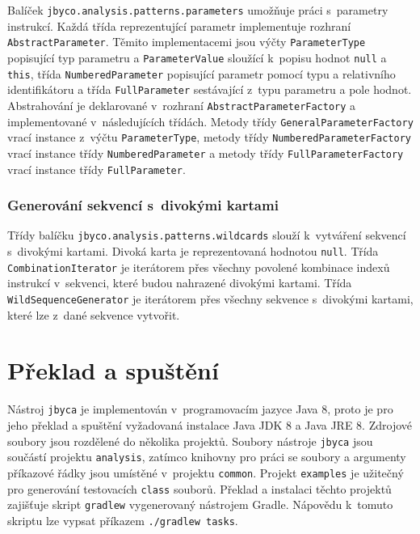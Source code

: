 Balíček \texttt{jbyco.analysis.patterns.parameters} umožňuje práci s~parametry instrukcí. Každá třída reprezentující parametr implementuje rozhraní \texttt{AbstractParameter}. Těmito implementacemi jsou výčty \texttt{ParameterType} popisující typ parametru a \texttt{ParameterValue} sloužící k~popisu hodnot \texttt{null} a \texttt{this}, třída \texttt{NumberedParameter} popisující parametr pomocí typu a relativního identifikátoru a třída \texttt{FullParameter} sestávající z~typu parametru a pole hodnot. Abstrahování je deklarované v~rozhraní \texttt{AbstractParameterFactory} a implementované v~následujících třídách. Metody třídy \texttt{GeneralParameterFactory} vrací instance z~výčtu \texttt{ParameterType}, metody třídy \texttt{NumberedParameterFactory} vrací instance třídy \texttt{NumberedParameter} a metody třídy \texttt{FullParameterFactory} vrací instance třídy \texttt{FullParameter}.

\subsubsection{Generování sekvencí s~divokými kartami}

Třídy balíčku \texttt{jbyco.analysis.patterns.wildcards} slouží k~vytváření sekvencí s~divokými kartami. Divoká karta je reprezentovaná hodnotou \texttt{null}. Třída \texttt{CombinationIterator} je iterátorem přes všechny povolené kombinace indexů instrukcí v~sekvenci, které budou nahrazené divokými kartami. Třída \texttt{WildSequenceGenerator} je iterátorem přes všechny sekvence s~divokými kartami, které lze z~dané sekvence vytvořit.

\section{Překlad a spuštění}\label{Jbyca:Run}

Nástroj \texttt{jbyca} je implementován v~programovacím jazyce Java 8, proto je pro jeho překlad a spuštění vyžadovaná instalace Java JDK 8 a Java JRE 8.
Zdrojové soubory jsou rozdělené do několika projektů. Soubory nástroje \texttt{jbyca} jsou součástí projektu \texttt{analysis}, zatímco knihovny pro práci se soubory a argumenty příkazové řádky jsou umístěné v~projektu \texttt{common}. Projekt \texttt{examples} je užitečný pro generování testovacích \texttt{class} souborů. Překlad a instalaci těchto projektů zajišťuje skript \texttt{gradlew} vygenerovaný nástrojem Gradle. Nápovědu k~tomuto skriptu lze vypsat příkazem \texttt{./gradlew tasks}. 


